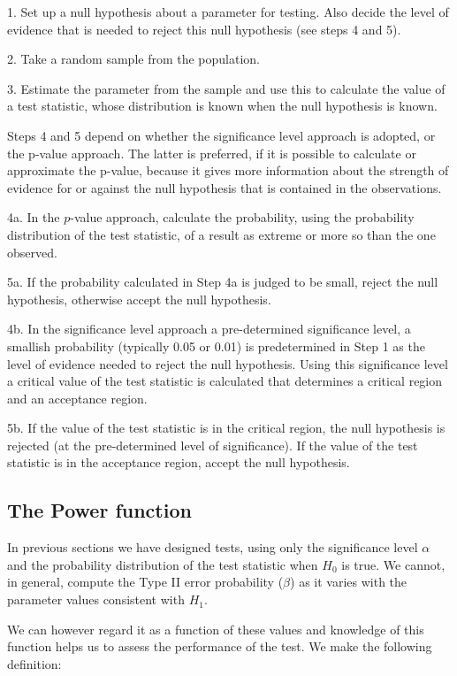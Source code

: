 \documentclass[12pt]{article}
\theoremstyle{break}
\begin{document}
1. Set up a null hypothesis about a parameter for testing. Also decide the level of evidence that is needed to reject this null hypothesis (see steps 4 and 5).

2. Take a random sample from the population.

3. Estimate the parameter from the sample and use this to calculate the value of a test statistic, whose distribution is known when the null hypothesis is known.

Steps 4 and 5 depend on whether the significance level approach is adopted, or the p-value approach. The latter is preferred, if it is possible to calculate or approximate the p-value, because it gives more information about the strength of evidence for or against the null hypothesis that is contained in the observations.

4a. In the $p$-value approach, calculate the probability, using the  probability distribution of the test statistic, of a result as extreme or more so than the one observed.

5a. If the probability calculated in Step 4a is judged to be small, reject the null hypothesis, otherwise accept the null hypothesis.

4b. In the significance level approach a pre-determined significance level, a smallish probability (typically 0.05 or 0.01) is predetermined in Step 1 as the level of evidence needed to reject the null hypothesis. Using this significance level a critical value of the test statistic is calculated that determines a critical region and an acceptance region.

5b. If the value of the test statistic is in the critical region, the null hypothesis is rejected (at the pre-determined level of significance). If the value of the test statistic is in the acceptance region, accept the null hypothesis.

\subsection{The Power function}
In previous sections we have designed tests, using only the significance level $\alpha$ and the probability distribution of the test statistic when $H_{0}$ is true. We cannot, in general, compute the Type II error probability ($\beta$) as it varies with the parameter values consistent with $H_{1}$.

We can however regard it as a function of these values and knowledge of this function helps us to assess the performance of the test. We make the following definition:
\end{document}
